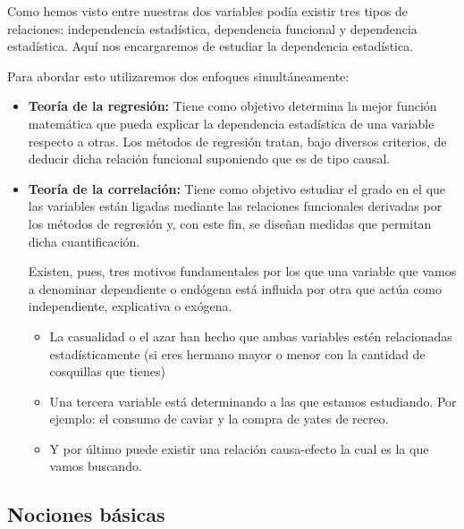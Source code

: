 \documentclass{article}
\theoremstyle{definition}
\begin{document}
	Como hemos visto entre nuestras dos variables podía existir tres tipos de
	relaciones: independencia estadística, dependencia funcional y dependencia
	estadística. Aquí nos encargaremos de estudiar la dependencia estadística.
	\vspace{2mm}

	Para abordar esto utilizaremos dos enfoques simultáneamente:

\begin{itemize}
	 \item \textbf{Teoría de la regresión:} Tiene como objetivo determina la mejor
	 función matemática que pueda explicar la dependencia estadística de una
	 variable respecto a otras. Los métodos de regresión tratan, bajo diversos
	 criterios, de deducir dicha relación funcional suponiendo que es de tipo
	 causal.

	 \vspace{2mm}

	 \item \textbf{Teoría de la correlación:} Tiene como objetivo
	 estudiar el grado en el que las variables están ligadas mediante las
	 relaciones funcionales derivadas por los métodos de regresión y, con este
	 fin, se diseñan medidas que permitan dicha cuantificación.

	 \vspace{2mm}
	 Existen, pues, tres motivos fundamentales por los que una
	 variable que vamos a denominar dependiente o endógena está influida por otra
	 que actúa como independiente, explicativa o exógena.

	 \begin{itemize}

	 \item La casualidad o el azar han hecho que ambas variables estén
	 relacionadas estadísticamente (si eres hermano mayor o menor con la
	 cantidad de cosquillas que tienes)
	 \item Una tercera variable está determinando a las que estamos estudiando.
	 Por ejemplo: el consumo de caviar y la compra de yates de recreo.
	 \item Y por último puede existir una relación causa-efecto la cual es la que vamos buscando.

 		\end{itemize}

\end{itemize}

	 \subsection{Nociones básicas}
\end{document}
